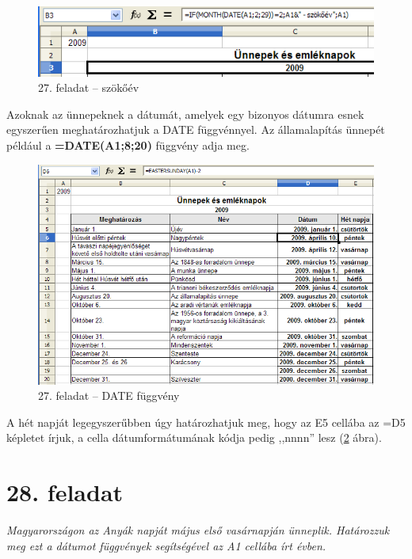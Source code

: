 \begin{figure}[!h]
\begin{center}
\includegraphics[width=13.783cm]{oocalcv1-img122.png}
\caption{27.  feladat --  szökőév}\label{27-feladatSzökőév}
\end{center}
\end{figure}

Azoknak az ünnepeknek a dátumát, amelyek egy bizonyos dátumra
esnek egyszerűen meghatározhatjuk a DATE függvénnyel. Az
államalapítás ünnepét például a
{\sffamily\bfseries{=DATE(A1;8;20)}} függvény adja meg.

\begin{figure}[!h]
\begin{center}
\includegraphics[width=15.999cm]{oocalcv1-img123.png}
\caption{27.  feladat -- DATE függvény}\label{27-feladatDateFüggvény}
\end{center}
\end{figure}

A hét napját legegyszerűbben úgy határozhatjuk meg, hogy az
E5 cellába az =D5 képletet írjuk, a cella dátumformátumának
kódja pedig ,,nnnn'' lesz (\ref{27-feladatDateFüggvény} ábra). 


\section{28. feladat}

{\itshape
Magyarországon az Anyák napját május első vasárnapján
ünneplik. Határozzuk meg ezt a dátumot függvények
segítségével az A1 cellába írt évben.}


